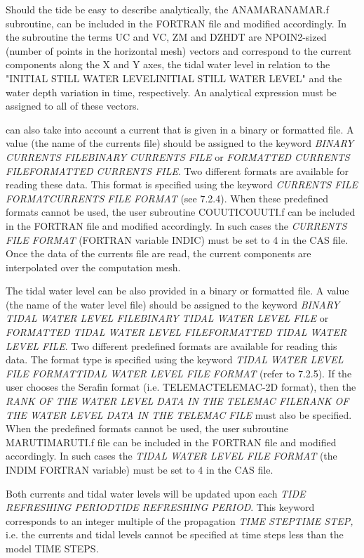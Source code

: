  Should the tide be easy to describe analytically, the ANAMARANAMAR.f subroutine, can be included in the FORTRAN file and modified accordingly. In the subroutine the terms UC and VC, ZM and DZHDT are NPOIN2-sized (number of points in the horizontal mesh) vectors and correspond to the current components along the X and Y axes, the tidal water level in relation to the "INITIAL STILL WATER LEVELINITIAL STILL WATER LEVEL" and the water depth variation in time, respectively. An analytical expression must be assigned to all of these vectors.

 \tomawac can also take into account a current that is given in a binary or formatted file. A value (the name of the currents file) should be assigned to the keyword \textit{BINARY CURRENTS FILEBINARY CURRENTS FILE }or\textit{ FORMATTED CURRENTS FILEFORMATTED CURRENTS FILE}. Two different formats are available for reading these data. This format is specified using the keyword \textit{CURRENTS FILE FORMATCURRENTS FILE FORMAT} (see 7.2.4). When these predefined formats cannot be used, the user subroutine COUUTICOUUTI.f can be included in the FORTRAN file and modified accordingly. In such cases the \textit{CURRENTS FILE FORMAT} (FORTRAN variable INDIC) must be set to 4 in the CAS file. Once the data of the currents file are read, the current components are interpolated over the computation mesh.

 The tidal water level can be also provided in a binary or formatted file. A value (the name of the water level file) should be assigned to the keyword \textit{BINARY TIDAL WATER LEVEL FILEBINARY TIDAL WATER LEVEL FILE }or\textit{ FORMATTED TIDAL WATER LEVEL FILEFORMATTED TIDAL WATER LEVEL FILE}. Two different predefined formats are available for reading this data. The format type is specified using the keyword \textit{TIDAL WATER LEVEL FILE FORMATTIDAL WATER LEVEL FILE FORMAT} (refer to 7.2.5). If the user chooses the Serafin format (i.e. TELEMACTELEMAC-2D format), then the \textit{RANK OF THE WATER LEVEL DATA IN THE TELEMAC FILERANK OF THE WATER LEVEL DATA IN THE TELEMAC FILE} must also be specified. When the predefined formats cannot be used, the user subroutine MARUTIMARUTI.f file can be included in the FORTRAN file and modified accordingly. In such cases the \textit{TIDAL WATER LEVEL FILE FORMAT} (the INDIM FORTRAN variable) must be set to 4 in the CAS file.

 Both currents and tidal water levels will be updated upon each \textit{TIDE REFRESHING PERIODTIDE REFRESHING PERIOD}. This keyword corresponds to an integer multiple of the propagation \textit{TIME STEPTIME STEP, }i.e. the currents and tidal levels cannot be specified at time steps less than the model TIME STEPS\textit{.}


